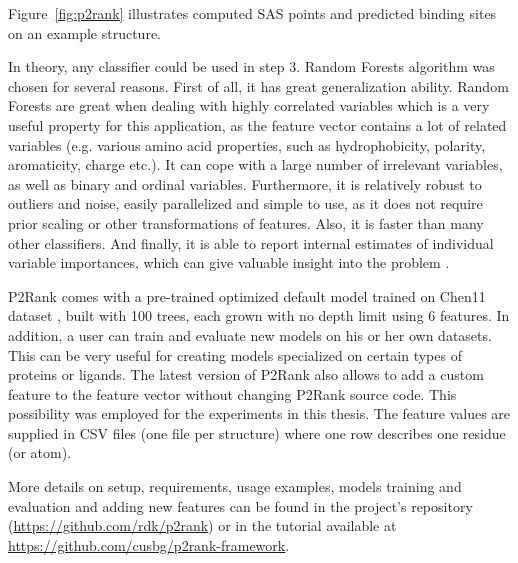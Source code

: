 Figure~\ref{fig:p2rank} illustrates computed SAS points and predicted binding sites on an example structure.

In theory, any classifier could be used in step 3. Random Forests algorithm was chosen for several reasons. First of all, it has great generalization ability. Random Forests are great when dealing with highly correlated variables \cite{forests_biology} which is a very useful property for this application, as the feature vector contains a lot of related variables (e.g. various amino acid properties, such as hydrophobicity, polarity, aromaticity, charge etc.). It can cope with a large number of irrelevant variables, as well as binary and ordinal variables. Furthermore, it is relatively robust to outliers and noise, easily parallelized and simple to use, as it does not require prior scaling or other transformations of features. Also, it is faster than many other classifiers. And finally, it is able to report internal estimates of individual variable importances, which can give valuable insight into the problem \cite{randomforests, forests_biology, p2rank2}.

P2Rank comes with a pre-trained optimized default model trained on Chen11 dataset \cite{benchmark}, built with 100 trees, each grown with no depth limit using 6 features. In addition, a user can train and evaluate new models on his or her own datasets. This can be very useful for creating models specialized on certain types of proteins or ligands. The latest version of P2Rank also allows to add a custom feature to the feature vector without changing P2Rank source code. This possibility was employed for the experiments in this thesis. The feature values are supplied in CSV files (one file per structure) where one row describes one residue (or atom).

More details on setup, requirements, usage examples, models training and evaluation and adding new features can be found in the project's repository (\url{https://github.com/rdk/p2rank}) or in the tutorial available at \url{https://github.com/cusbg/p2rank-framework}.


